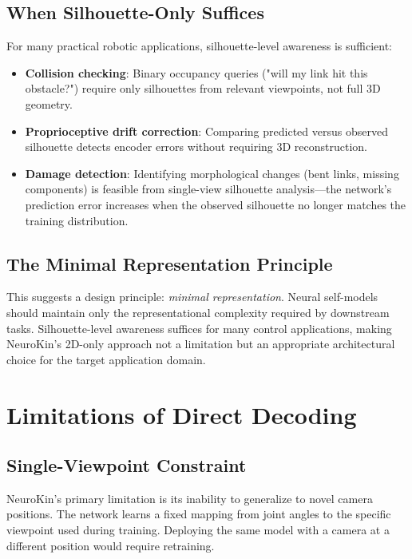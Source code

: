 \documentclass[12pt,a4paper,oneside]{report}
\begin{document}
\subsection{When Silhouette-Only Suffices}

For many practical robotic applications, silhouette-level awareness is sufficient:

\begin{itemize}
    \item \textbf{Collision checking}: Binary occupancy queries ("will my link hit this obstacle?") require only silhouettes from relevant viewpoints, not full 3D geometry.
    \item \textbf{Proprioceptive drift correction}: Comparing predicted versus observed silhouette detects encoder errors without requiring 3D reconstruction.
    \item \textbf{Damage detection}: Identifying morphological changes (bent links, missing components) is feasible from single-view silhouette analysis—the network's prediction error increases when the observed silhouette no longer matches the training distribution.
\end{itemize}

\subsection{The Minimal Representation Principle}

This suggests a design principle: \textit{minimal representation}. Neural self-models should maintain only the representational complexity required by downstream tasks. Silhouette-level awareness suffices for many control applications, making NeuroKin's 2D-only approach not a limitation but an appropriate architectural choice for the target application domain.

\section{Limitations of Direct Decoding}

\subsection{Single-Viewpoint Constraint}

NeuroKin's primary limitation is its inability to generalize to novel camera positions. The network learns a fixed mapping from joint angles to the specific viewpoint used during training. Deploying the same model with a camera at a different position would require retraining.
\end{document}
